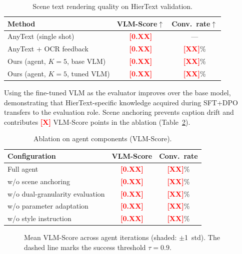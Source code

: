 \documentclass[uplatex,10pt,twocolumn,a4paper]{article}
\newcommand{\TODO}[1]{\textcolor{red}{\textbf{[#1]}}}
\begin{document}
\begin{table}[t]
  \centering
  \caption{Scene text rendering quality on HierText validation.}
  \label{tab:rendering}
  \small
  \begin{tabular}{lcc}
    \toprule
    Method & VLM-Score$\uparrow$ & Conv.\ rate$\uparrow$ \\
    \midrule
    AnyText (single shot)           & \TODO{0.XX} & --- \\
    AnyText + OCR feedback          & \TODO{0.XX} & \TODO{XX}\% \\
    Ours (agent, $K=5$, base VLM)  & \TODO{0.XX} & \TODO{XX}\% \\
    Ours (agent, $K=5$, tuned VLM) & \TODO{0.XX} & \TODO{XX}\% \\
    \bottomrule
  \end{tabular}
\end{table}

Using the fine-tuned VLM as the evaluator improves over the base model,
demonstrating that HierText-specific knowledge acquired during SFT+DPO
transfers to the evaluation role.
Scene anchoring prevents caption drift and contributes
\TODO{X} VLM-Score points in the ablation (Table~\ref{tab:ablation_agent}).

\begin{table}[t]
  \centering
  \caption{Ablation on agent components (VLM-Score).}
  \label{tab:ablation_agent}
  \small
  \begin{tabular}{lcc}
    \toprule
    Configuration & VLM-Score & Conv.\ rate \\
    \midrule
    Full agent                       & \TODO{0.XX} & \TODO{XX}\% \\
    w/o scene anchoring              & \TODO{0.XX} & \TODO{XX}\% \\
    w/o dual-granularity evaluation  & \TODO{0.XX} & \TODO{XX}\% \\
    w/o parameter adaptation         & \TODO{0.XX} & \TODO{XX}\% \\
    w/o style instruction            & \TODO{0.XX} & \TODO{XX}\% \\
    \bottomrule
  \end{tabular}
\end{table}

\begin{figure}[t]
  \centering
  \fbox{\rule{0pt}{30mm}\rule{0.96\linewidth}{0pt}}
  \caption{
    Mean VLM-Score across agent iterations (shaded: $\pm$1~std).
    The dashed line marks the success threshold $\tau = 0.9$.
  }
  \label{fig:convergence}
\end{figure}
\end{document}
